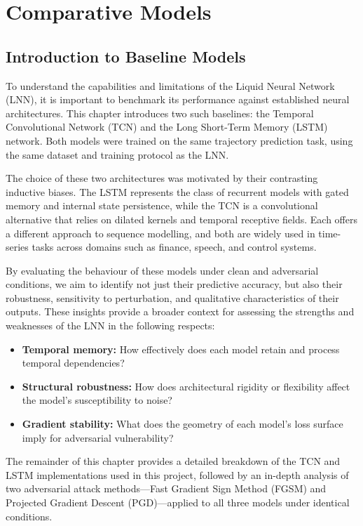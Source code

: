 \chapter{Comparative Models}

\section{Introduction to Baseline Models}

To understand the capabilities and limitations of the Liquid Neural Network (LNN), it is important to benchmark its performance against established neural architectures. This chapter introduces two such baselines: the Temporal Convolutional Network (TCN) and the Long Short-Term Memory (LSTM) network. Both models were trained on the same trajectory prediction task, using the same dataset and training protocol as the LNN.

The choice of these two architectures was motivated by their contrasting inductive biases. The LSTM represents the class of recurrent models with gated memory and internal state persistence, while the TCN is a convolutional alternative that relies on dilated kernels and temporal receptive fields. Each offers a different approach to sequence modelling, and both are widely used in time-series tasks across domains such as finance, speech, and control systems.

By evaluating the behaviour of these models under clean and adversarial conditions, we aim to identify not just their predictive accuracy, but also their robustness, sensitivity to perturbation, and qualitative characteristics of their outputs. These insights provide a broader context for assessing the strengths and weaknesses of the LNN in the following respects:
\begin{itemize}
    \item \textbf{Temporal memory:} How effectively does each model retain and process temporal dependencies?
    \item \textbf{Structural robustness:} How does architectural rigidity or flexibility affect the model's susceptibility to noise?
    \item \textbf{Gradient stability:} What does the geometry of each model’s loss surface imply for adversarial vulnerability?
\end{itemize}

The remainder of this chapter provides a detailed breakdown of the TCN and LSTM implementations used in this project, followed by an in-depth analysis of two adversarial attack methods—Fast Gradient Sign Method (FGSM) and Projected Gradient Descent (PGD)—applied to all three models under identical conditions.



